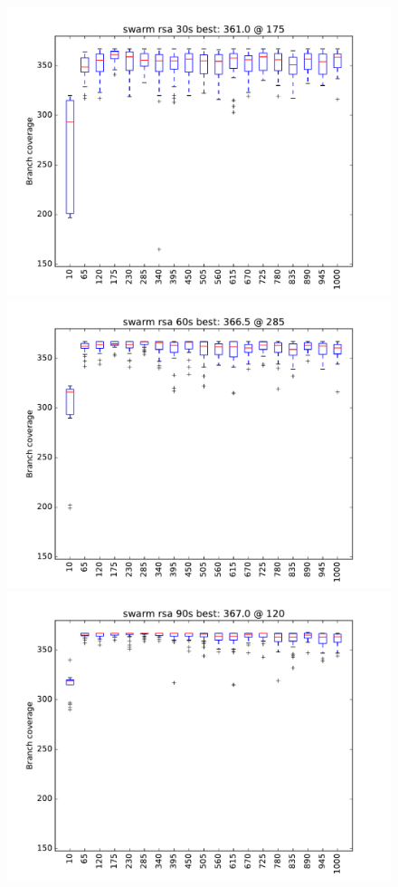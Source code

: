 \begin{figure}
\includegraphics[width=\columnwidth]{graphs/rsaswarm30}
\includegraphics[width=\columnwidth]{graphs/rsaswarm60}
\includegraphics[width=\columnwidth]{graphs/rsaswarm90}
\end{figure}


